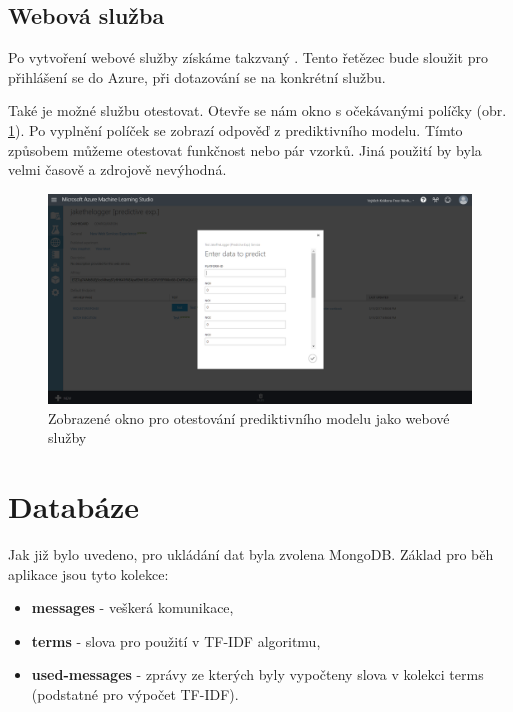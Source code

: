 \documentclass[thesis=M,czech]{FITthesis}[2012/10/20]
\begin{document}
		\subsection{Webová služba}
		  Po vytvoření webové služby získáme takzvaný . Tento řetězec bude sloužit pro přihlášení se do Azure, při dotazování se na konkrétní službu.
		  
		  Také je možné službu otestovat. Otevře se nám okno s očekávanými políčky (obr. \ref{fig:azure_test_web_service}). Po vyplnění políček se zobrazí odpověď z prediktivního modelu. Tímto způsobem můžeme otestovat funkčnost nebo pár vzorků. Jiná použití by byla velmi časově a zdrojově nevýhodná.
		  
		  \begin{figure}[htb]\centering
		  	\includegraphics[width=\textwidth]{./img/testPredictive}
		  	\caption{Zobrazené okno pro otestování prediktivního modelu jako webové služby}
		  	\label{fig:azure_test_web_service}
		  \end{figure}
	\section{Databáze}
	\label{sec:database}	
	Jak již bylo uvedeno, pro ukládání dat byla zvolena MongoDB. Základ pro běh aplikace jsou tyto kolekce:
		
	\begin{itemize} 
		\item \textbf{messages} - veškerá komunikace,
		\item \textbf{terms} - slova pro použití v TF-IDF algoritmu,
		\item \textbf{used-messages} - zprávy ze kterých byly vypočteny slova v kolekci terms (podstatné pro výpočet TF-IDF).	
	\end{itemize} 
	
\end{document}
